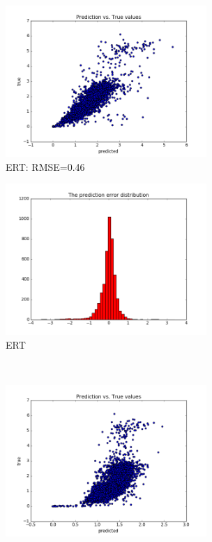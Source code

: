 \documentclass{article}
\begin{document}
\begin{figure}[ht]
  \hspace*{-4cm}
  \begin{subfigure}[b]{.9\linewidth}
    \centering
    \includegraphics[width=3in]{12ERT_true_vs_predicted_RMSE_046}
    \caption{ERT: RMSE=0.46}\label{fig:3a}
  \end{subfigure}%
  \hspace*{-4cm}
  \begin{subfigure}[b]{.9\linewidth}
    \centering
    \includegraphics[width=3in]{12ERT_error_histogram_RMSE_046}
    \caption{ERT}\label{fig:3b}
  \end{subfigure}%
  \\
  \hspace*{-4cm}
  \begin{subfigure}[b]{.9\linewidth}
    \centering
    \includegraphics[width=3in]{12LRERT_true_vs_predicted_RMSE_075}

\end{subfigure}
\end{figure}
\end{document}
